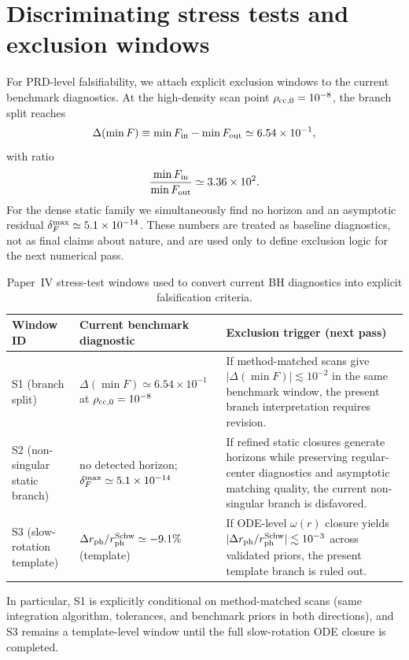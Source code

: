 \documentclass[aps,prd,onecolumn,nofootinbib,superscriptaddress]{revtex4-2}
\begin{document}
\section{Discriminating stress tests and exclusion windows}
For PRD-level falsifiability, we attach explicit exclusion windows to the current benchmark diagnostics.
At the high-density scan point $\rho_{\rm cc,0}=10^{-8}$, the branch split reaches
\begin{equation}
\Delta(\min F)\equiv \min F_{\rm in}-\min F_{\rm out}\simeq 6.54\times 10^{-1},
\end{equation}
with ratio
\begin{equation}
\frac{\min F_{\rm in}}{\min F_{\rm out}}\simeq 3.36\times 10^2.
\end{equation}
For the dense static family we simultaneously find no horizon and an asymptotic residual
$\delta_F^{\rm max}\simeq 5.1\times 10^{-14}$.
These numbers are treated as baseline diagnostics, not as final claims about nature, and are used only to define exclusion logic for the next numerical pass.

\begin{table}[t]
  \centering
  \begin{tabular}{lll}
    \hline\hline
    Window ID & Current benchmark diagnostic & Exclusion trigger (next pass) \\
    \hline
    S1 (branch split) &
    $\Delta(\min F)\simeq 6.54\times10^{-1}$ at $\rho_{\rm cc,0}=10^{-8}$ &
    If method-matched scans give $|\Delta(\min F)|\lesssim 10^{-2}$ in the same benchmark window, the present branch interpretation requires revision. \\
    S2 (non-singular static branch) &
    no detected horizon; $\delta_F^{\rm max}\simeq 5.1\times10^{-14}$ &
    If refined static closures generate horizons while preserving regular-center diagnostics and asymptotic matching quality, the current non-singular branch is disfavored. \\
    S3 (slow-rotation template) &
    $\Delta r_{\rm ph}/r_{\rm ph}^{\rm Schw}\simeq -9.1\%$ (template) &
    If ODE-level $\omega(r)$ closure yields $|\Delta r_{\rm ph}/r_{\rm ph}^{\rm Schw}|\lesssim 10^{-3}$ across validated priors, the present template branch is ruled out. \\
    \hline\hline
  \end{tabular}
  \caption{Paper~IV stress-test windows used to convert current BH diagnostics into explicit falsification criteria.}
  \label{tab:paper4-stress}
\end{table}
In particular, S1 is explicitly conditional on method-matched scans (same integration algorithm, tolerances, and benchmark priors in both directions), and S3 remains a template-level window until the full slow-rotation ODE closure is completed.
\end{document}
